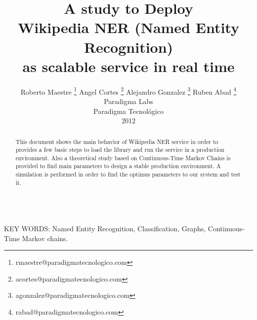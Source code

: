 \documentclass[a4paper,11pt]{article}
\begin{document}
\title{A study to Deploy \\ Wikipedia NER (Named Entity Recognition) \\as scalable service in real time}


\author{{Roberto Maestre \footnote{rmaestre@paradigmatecnologico.com}  
				Angel Cortes \footnote{acortes@paradigmatecnologico.com} 
				Alejandro Gonzalez \footnote{agonzalez@paradigmatecnologico.com} 
				Ruben Abad \footnote{rabad@paradigmatecnologico.com}
				} \\
{\small Paradigma Labs \\ Paradigma Tecnológico \\ 2012}}

\date{}
\maketitle




\begin{abstract} This document shows the main behavior of Wikipedia NER service in order to provides a few basic steps to load the library and run the service in a production environment. Also a theoretical study based on Continuous-Time Markov Chains is provided to find main parameters to design a stable production environment. A simulation is performed in order to find the optimus parameters to our system and test it.
\end{abstract}


\ \\
KEY WORDS: Named Entity Recognition, Classification, Graphs, Continuous-Time Markov chains.
\end{document}

